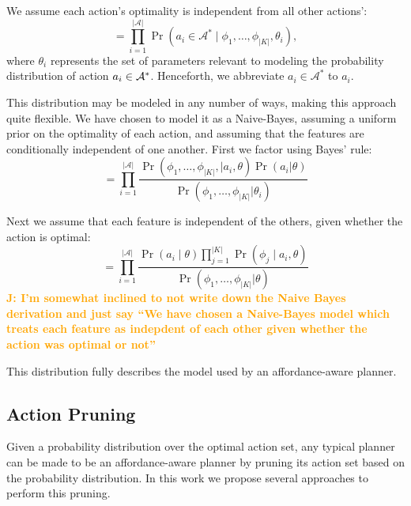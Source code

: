 \documentclass[conference]{IEEEtran}
\newcommand{\jnote}[1]{\textcolor{Orange}{\textbf{J: #1}}}
\begin{document}
We assume each action's optimality is independent from all other actions':
\begin{equation}
= \prod_{i=1}^{|\mathcal{A}|} \Pr(a_i \in \mathcal{A}^* \mid \phi_1, \ldots, \phi_{|K|}, \theta_i),
\label{eq:action_independ}
\end{equation}
where $\theta_i$ represents the set of parameters relevant to modeling the probability distribution of action $a_i \in {\cal A}^*$. Henceforth, we abbreviate $a_i \in \mathcal{A}^*$ to $a_i$.

This distribution may be modeled in any number of ways, making this approach quite flexible.
We have chosen to model it as a Naive-Bayes, assuming a uniform prior
on the optimality of each action, and assuming that the features are
conditionally independent of one another.  First we factor using Bayes' rule:
\begin{equation}
= \prod_{i=1}^{|\mathcal{A}|} \frac{\Pr(\phi_1, \ldots, \phi_{|K|}, \mid a_i, \theta) \Pr(a_i | \theta)}{\Pr(\phi_1, \ldots, \phi_{|K|} | \theta_i)}
\label{eq:bayes}
\end{equation}

Next we assume that each feature is independent of the others, given
whether the action is optimal:
\begin{equation}
= \prod_{i=1}^{|\mathcal{A}|} \frac{\Pr(a_i \mid \theta) \prod_{j=1}^{|K|} \Pr(\phi_j \mid a_i, \theta) }{\Pr(\phi_1, \ldots, \phi_{|K|} | \theta)}
\label{eq:final}
\end{equation}
\jnote{I'm somewhat inclined to not write down the Naive Bayes derivation and just say ``We have chosen a Naive-Bayes model which treats each feature as indepdent of each other given whether the action was optimal or not''}

This distribution fully describes the model used by an affordance-aware planner. 

\subsection{Action Pruning}
\label{sec:action_pruning}
Given a probability distribution over the optimal action set, any typical
planner can be made to be an affordance-aware planner by pruning its action
set based on the probability distribution. In this work we propose several approaches to perform this pruning.
\end{document}
